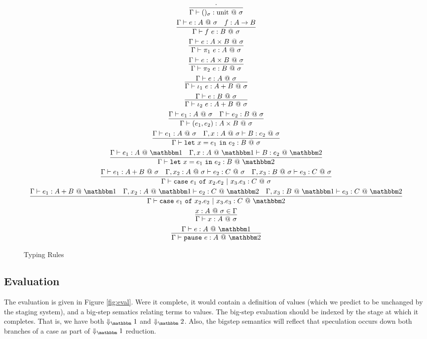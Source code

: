\documentclass[11pt]{article}
\makeatletter
\newcommand {\bbone} {\mathbbm 1}
\newcommand {\bbtwo} {\mathbbm 2}
\newcommand {\at} {{\tt~@~}}
\newcommand {\pause} {{\tt pause}}
\newcommand {\letin} [3] {{\tt let}~{#1} = {#2}~{\tt in}~{#3}}
\newcommand {\caseof} [3] {{\tt case}~{#1} ~{\tt of}~{#2}~{\tt |}~{#3}}
\newcommand {\inferenceSpacing}{\setlength{\jot}{1.8ex}}
\makeatother
\begin{document}
\begin{figure}
\caption{Typing Rules}
\label{fig:staging}
\inferenceSpacing
\begin{gather}
\infer {\Gamma\vdash ()_\sigma : \text{unit}\at\sigma}{\cdot} \\
\infer {\Gamma\vdash f~e : B\at\sigma}{\Gamma\vdash e : A\at\sigma & f : A \to B} \\
\infer {\Gamma\vdash \pi_1~e : A \at \sigma}{\Gamma\vdash e : A\times B \at \sigma} \\
\infer {\Gamma\vdash \pi_2~e : B \at \sigma}{\Gamma\vdash e : A\times B \at \sigma} \\
\infer {\Gamma\vdash \iota_1~e : A+B\at\sigma}{\Gamma\vdash e : A\at\sigma} \\
\infer {\Gamma\vdash \iota_2~e : A+B\at\sigma}{\Gamma\vdash e : B\at\sigma} \\
\infer {\Gamma\vdash (e_1,e_2) : A\times B \at \sigma}{\Gamma\vdash e_1 : A \at \sigma & \Gamma\vdash e_2 : B \at \sigma} \\
\infer {\Gamma\vdash \letin {x}{e_1}{e_2} : B \at \sigma}{\Gamma\vdash e_1 : A \at \sigma & \Gamma,x:A \at \sigma \vdash B : e_2 \at \sigma} \\
\infer {\Gamma\vdash \letin {x}{e_1}{e_2} : B \at \bbtwo}{\Gamma\vdash e_1 : A \at \bbone & \Gamma,x:A \at \bbone \vdash B : e_2 \at \bbtwo} \\
\infer {\Gamma\vdash \caseof {e_1}{x_2.e_2}{x_3.e_3} : C\at\sigma}{\Gamma\vdash e_1 : A+B\at\sigma & \Gamma,x_2:A\at\sigma \vdash e_2 : C\at\sigma & \Gamma,x_3:B\at\sigma \vdash e_3 : C\at\sigma} \\
\infer {\Gamma\vdash \caseof {e_1}{x_2.e_2}{x_3.e_3} : C\at\bbtwo}{\Gamma\vdash e_1 : A+B\at\bbone & \Gamma,x_2:A\at\bbone \vdash e_2 : C\at\bbtwo & \Gamma,x_3:B\at\bbone \vdash e_3 : C\at\bbtwo} \\
\infer {\Gamma\vdash x : A\at\sigma}{x : A\at\sigma \in \Gamma} \\
\infer {\Gamma\vdash \pause~e : A\at\bbtwo}{\Gamma\vdash e : A\at\bbone}
\end{gather}
\end{figure}

\subsection{Evaluation}
The evaluation is given in Figure \ref{fig:eval}.  Were it complete, it would contain a definition of values (which we predict to be unchanged by the staging system), and a big-step sematics relating terms to values.  The big-step evaluation should be indexed by the stage at which it completes.  That is, we have both $\Downarrow_\bbone$ and $\Downarrow_\bbtwo$.  Also, the bigstep semantics will reflect that speculation occurs down both branches of a case as part of  $\Downarrow_\bbone$ reduction.
\end{document}
